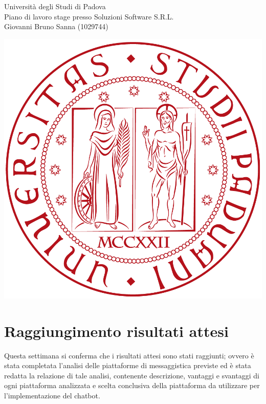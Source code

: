 \documentclass[11pt,notitlepage]{article}
\newcommand{\nomeStudente}{Giovanni Bruno}
\newcommand{\cognomeStudente}{Sanna}
\newcommand{\matricolaStudente}{1029744}
\newcommand{\ragioneSocAzienda}{Soluzioni Software S.R.L.}
\begin{document}
\newpage
\noindent
\parbox{0.7\columnwidth}{Università degli Studi di Padova\\
	Piano di lavoro stage presso \ragioneSocAzienda{}\\
	\nomeStudente{} \cognomeStudente{} (\matricolaStudente{})}%
\parbox{0.3\columnwidth}{
	\hfill \includegraphics[scale=0.08]{immagini/logo-unipd.png}}

\bigskip
\section*{Raggiungimento risultati attesi}
Questa settimana si conferma che i risultati attesi sono stati raggiunti; ovvero è stata completata l'analisi delle piattaforme di messaggistica previste ed è stata redatta la relazione di tale analisi, contenente descrizione, vantaggi e svantaggi di ogni piattaforma analizzata e scelta conclusiva della piattaforma da utilizzare per l'implementazione del chatbot.
\end{document}
